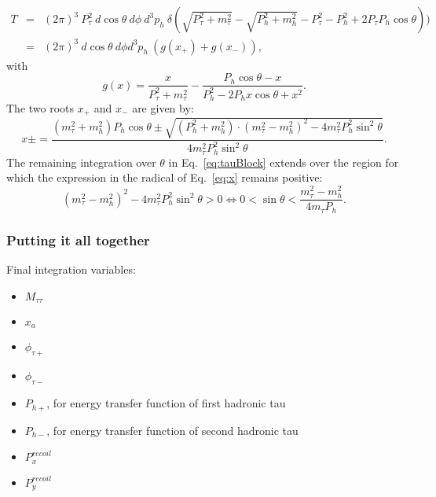 \begin{eqnarray}
T & = & (2\pi)^3 \ P_{\tau}^2 \ d\cos\theta \ d\phi \ d^3p_{h} \ \delta(\sqrt{P_{\tau}^2 + m_{\tau}^2} - \sqrt{P_{h}^2 + m_{h}^2} - P_{\tau}^2 - P_{h}^2 + 2 P_{\tau} P_{h} \cos\theta)) \nonumber \\
  & = & (2\pi)^3 \ d\cos\theta \ d\phi d^3p_{h} \ \left( g(x_{+}) + g(x_{-}) \right),
\label{eq:tauBlock}
\end{eqnarray}
with 
\begin{equation*}
g(x) = \frac{x}{P_{\tau}^2 + m_{\tau}^2} - \frac{P_{h} \cos\theta - x}{P_{h}^2 - 2 P_{h} x \cos\theta + x^2}.
\end{equation*}
The two roots $x_{+}$ and $x_{-}$ are given by:
\begin{equation}
x{\pm} = \frac{(m_{\tau}^2 + m_{h}^2) P_{h} \cos\theta \pm \sqrt{(P_{h}^2 + m_{h}^2) \cdot (m_{\tau}^2 - m_{h}^2)^2 - 4 m_{\tau}^2 P_{h}^2 \sin^2\theta}}{4 m_{\tau}^2 P_{h}^2 \sin^2\theta}.
\label{eq:x}
\end{equation}
The remaining integration over $\theta$ in Eq.~\ref{eq:tauBlock} extends over the region for which the expression in the radical of Eq.~\ref{eq:x} remains positive:
\begin{equation*}
(m_{\tau}^2 - m_{h}^2)^2 - 4 m_{\tau}^2 P_{h}^2 \sin^2\theta > 0 \Leftrightarrow 0 < \sin \theta < \frac{m_{\tau}^2 - m_{h}^2}{4 m_{\tau} P_{h}}.
\end{equation*}

\subsubsection{Putting it all together}

Final integration variables:
\begin{itemize}
\item $M_{\tau\tau}$
\item $x_{a}$
\item $\phi_{\tau+}$
\item $\phi_{\tau-}$
\item $P_{h+}$, for energy transfer function of first hadronic tau
\item $P_{h-}$, for energy transfer function of second hadronic tau
\item $P_{x}^{recoil}$
\item $P_{y}^{recoil}$
\end{itemize}


